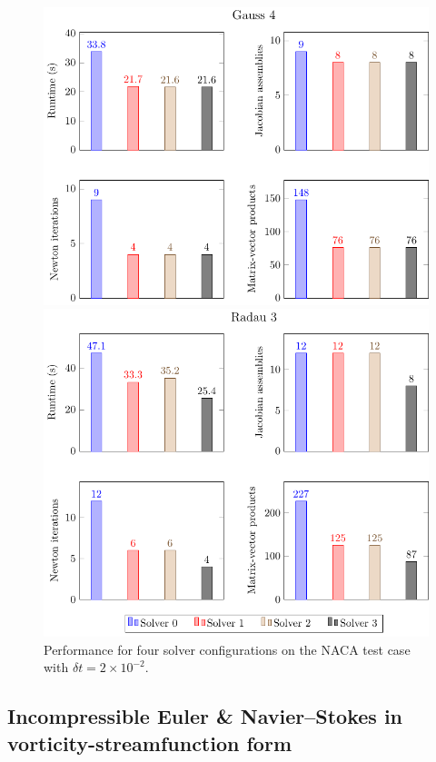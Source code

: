 \documentclass[review]{siamart}
\begin{document}
\begin{figure}
	\centering
	\includegraphics[width=0.65\linewidth]{figures/barchart/gauss4}

	\vspace{\floatsep}

	\includegraphics[width=0.65\linewidth]{figures/barchart/radau3}
	\caption{Performance for four solver configurations on the NACA test case with $\delta t = 2 \times 10^{-2}.$}
	\label{fig:naca-nonlin-solvers}
\end{figure}

\subsection{Incompressible Euler \& Navier--Stokes in vorticity-streamfunction form}
\label{sec:numerics:khi}
\end{document}
